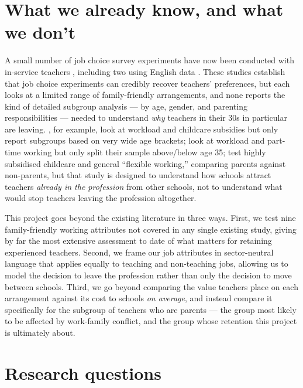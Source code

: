 \section{What we already know, and what we don't}

A small number of job choice survey experiments have now been conducted with in-service teachers
\citep{johnston2021preferences,lentini2024teachers,levatino2024unveiling,lovison2024investing},
including two using English data \citep{allen2025evaluating,burge2021understanding}. These
studies establish that job choice experiments can credibly recover teachers' preferences, but
each looks at a limited range of family-friendly arrangements, and none reports the kind of
detailed subgroup analysis --- by age, gender, and parenting responsibilities --- needed to
understand \emph{why} teachers in their 30s in particular are leaving. \citet{lovison2024investing},
for example, look at workload and childcare subsidies but only report subgroups based on very
wide age brackets; \citet{burge2021understanding} look at workload and part-time working but only
split their sample above/below age 35; \citet{allen2025evaluating} test highly subsidised
childcare and general ``flexible working,'' comparing parents against non-parents, but that study
is designed to understand how schools attract teachers \emph{already in the profession} from
other schools, not to understand what would stop teachers leaving the profession altogether.

This project goes beyond the existing literature in three ways. First, we test nine
family-friendly working attributes not covered in any single existing study, giving by far the
most extensive assessment to date of what matters for retaining experienced teachers. Second,
we frame our job attributes in sector-neutral language that applies equally to teaching and
non-teaching jobs, allowing us to model the decision to leave the profession rather than only the
decision to move between schools. Third, we go beyond comparing the value teachers place on each
arrangement against its cost to schools \emph{on average}, and instead compare it specifically for
the subgroup of teachers who are parents --- the group most likely to be affected by work-family
conflict, and the group whose retention this project is ultimately about.

\section{Research questions}


